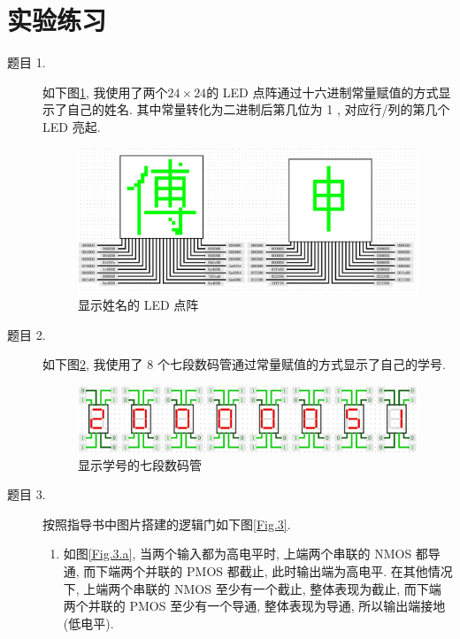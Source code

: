 \documentclass[UTF8,fontset=fandol]{ctexart}
\begin{document}
\section*{实验练习}
\begin{description}
    \item[题目 1.] 如下图\ref{Fig.1}, 我使用了两个$24\times24$的 LED 点阵通过十六进制常量赋值的方式显示了自己的姓名. 其中常量转化为二进制后第几位为 1 , 对应行/列的第几个 LED 亮起.
    \begin{figure}[H]
        \centering
        \includegraphics[width = \linewidth]{images/1.Name.jpg}
        \caption{显示姓名的 LED 点阵}
        \label{Fig.1}
    \end{figure} 
    \item[题目 2.] 如下图\ref{Fig.2}, 我使用了 8 个七段数码管通过常量赋值的方式显示了自己的学号.
    \begin{figure}[H]
        \centering
        \includegraphics[width = \linewidth]{images/2.Number.jpg}
        \caption{显示学号的七段数码管}
        \label{Fig.2}
    \end{figure} 
    \item[题目 3.] 按照指导书中图片搭建的逻辑门如下图\ref{Fig.3}.
    \begin{enumerate}
        \item 如图\ref{Fig.3.a}, 当两个输入都为高电平时, 上端两个串联的 NMOS 都导通, 而下端两个并联的 PMOS 都截止, 此时输出端为高电平. 在其他情况下, 上端两个串联的 NMOS 至少有一个截止, 整体表现为截止, 而下端两个并联的 PMOS 至少有一个导通, 整体表现为导通, 所以输出端接地 (低电平). 

\end{enumerate}
\end{description}
\end{document}

